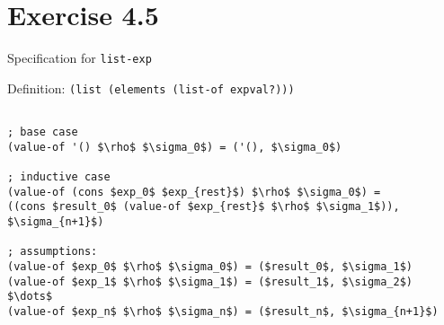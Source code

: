 \section*{Exercise 4.5}

Specification for \texttt{list-exp}

Definition: \texttt{(list (elements (list-of expval?)))}

\begin{center}
\begin{lstlisting}[mathescape]

; base case
(value-of '() $\rho$ $\sigma_0$) = ('(), $\sigma_0$)

; inductive case
(value-of (cons $exp_0$ $exp_{rest}$) $\rho$ $\sigma_0$) =
((cons $result_0$ (value-of $exp_{rest}$ $\rho$ $\sigma_1$)), $\sigma_{n+1}$)

; assumptions:
(value-of $exp_0$ $\rho$ $\sigma_0$) = ($result_0$, $\sigma_1$)
(value-of $exp_1$ $\rho$ $\sigma_1$) = ($result_1$, $\sigma_2$)
$\dots$
(value-of $exp_n$ $\rho$ $\sigma_n$) = ($result_n$, $\sigma_{n+1}$)

\end{lstlisting}
\end{center}
